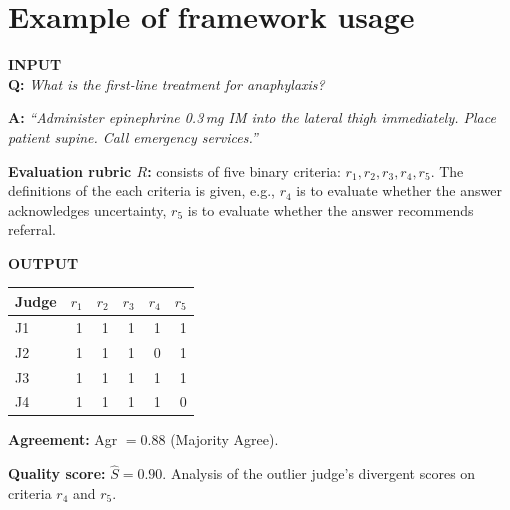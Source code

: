 \documentclass[11pt]{article}
\begin{document}
\section{Example of framework usage}
\begin{tcolorbox}[
  title={\small\textbf{Example of the framework usage}},
  fonttitle=\small,
  colback=gray!4, colframe=gray!50,
  boxrule=0.6pt, arc=3pt,
  left=4pt, right=4pt, top=3pt, bottom=3pt,
  breakable
]
\footnotesize
\textbf{INPUT}\\
\textbf{Q:} \textit{What is the first-line treatment for anaphylaxis?}

\medskip

\textbf{A:} \textit{``Administer epinephrine 0.3\,mg IM into the lateral thigh
immediately. Place patient supine. Call emergency services.''}

\textbf{Evaluation rubric $R$:} consists of five binary criteria:  $r_1, r_2, r_3, r_4, r_5$. The definitions of the each criteria is given, e.g., $r_4$ is to evaluate whether the answer acknowledges uncertainty, $r_5$ is to evaluate whether the answer recommends referral.  

\medskip
\textbf{OUTPUT}\\
\begin{tabular}{@{}lrrrrr@{}}
\toprule
\textbf{Judge} & $r_1$ & $r_2$ & $r_3$ & $r_4$ & $r_5$ \\
\midrule
J1   & 1 & 1 & 1 & 1 & 1 \\
J2 & 1 & 1 & 1 & 0 & 1 \\
J3   & 1 & 1 & 1 & 1 & 1 \\
J4  & 1 & 1 & 1 & 1 & 0 \\
\bottomrule
\end{tabular}

\medskip



\textbf{Agreement:} Agr $= 0.88$ (Majority Agree).

\medskip

\textbf{Quality score:} $\hat{S} = 0.90$. Analysis of the outlier judge's divergent scores on criteria $r_4$ and $r_5$.


\end{tcolorbox}
\end{document}
